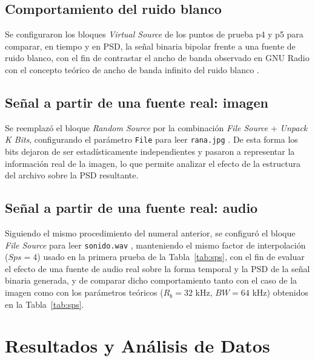 \documentclass[twocolumn]{IEEEtran}
\begin{document}
\subsection{Comportamiento del ruido blanco}
Se configuraron los bloques \emph{Virtual Source} de los puntos de prueba p4 y p5 para comparar, en tiempo y en PSD, la señal binaria bipolar frente a una fuente de ruido blanco, con el fin de contrastar el ancho de banda observado en GNU Radio con el concepto teórico de ancho de banda infinito del ruido blanco \cite{ortega2019comunicaciones}.

\subsection{Señal a partir de una fuente real: imagen}
Se reemplazó el bloque \emph{Random Source} por la combinación \emph{File Source} + \emph{Unpack K Bits}, configurando el parámetro \texttt{File} para leer \texttt{rana.jpg} \cite{ortega2021rana}. De esta forma los bits dejaron de ser estadísticamente independientes y pasaron a representar la información real de la imagen, lo que permite analizar el efecto de la estructura del archivo sobre la PSD resultante.

\subsection{Señal a partir de una fuente real: audio}
Siguiendo el mismo procedimiento del numeral anterior, se configuró el bloque \emph{File Source} para leer \texttt{sonido.wav} \cite{ortega2021sonido}, manteniendo el mismo factor de interpolación ($Sps=4$) usado en la primera prueba de la Tabla~\ref{tab:sps}, con el fin de evaluar el efecto de una fuente de audio real sobre la forma temporal y la PSD de la señal binaria generada, y de comparar dicho comportamiento tanto con el caso de la imagen como con los parámetros teóricos ($R_b=32$ kHz, $BW=64$ kHz) obtenidos en la Tabla~\ref{tab:sps}.


























\section{Resultados y Análisis de Datos}
\end{document}
